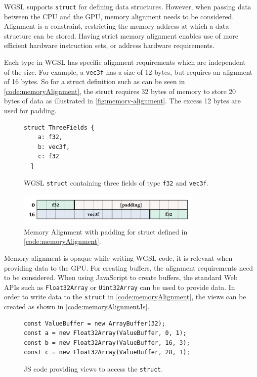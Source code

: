 \gls{WGSL} supports \verb|struct| for defining data structures. However, when passing data between the CPU and the GPU, memory alignment needs to be considered. Alignment is a constraint, restricting the memory address at which a data structure can be stored. Having strict memory alignment enables use of more efficient hardware instruction sets, or address hardware requirements.

Each type in \gls{WGSL} has specific alignment requirements which are independent of the size. For example, a \verb|vec3f| has a size of 12 bytes, but requires an alignment of 16 bytes. So for a struct definition such as can be seen in \autoref{code:memoryAlignment}, the struct requires 32 bytes of memory to store 20 bytes of data as illustrated in \autoref{fig:memory-alignment}. The excess 12 bytes are used for padding.

\begin{figure}[H]
  \begin{lstlisting}[style=wgsl]
  struct ThreeFields {
    a: f32,
    b: vec3f,
    c: f32
  }
  \end{lstlisting}
  \caption{\gls{WGSL} \texttt{struct} containing three fields of type \texttt{f32} and \texttt{vec3f}.}
  \label{code:memoryAlignment}
  \end{figure}

\begin{figure}[H]
  \centering
  \includegraphics[width=0.8\textwidth]{resources/memory-alignment.png}
  \caption{Memory Alignment with padding for struct defined in \autoref{code:memoryAlignment}.}
  \label{fig:memory-alignment}
\end{figure}

Memory alignment is opaque while writing \gls{WGSL} code, it is relevant when providing data to the GPU. For creating buffers, the alignment requirements need to be considered. When using JavaScript to create buffers, the standard Web \glspl{API} such as \texttt{Float32Array} or \texttt{Uint32Array} can be used to provide data. In order to write data to the \texttt{struct} in \autoref{code:memoryAlignment}, the views can be created as shown in \autoref{code:memoryAlignmentJs}.

\begin{figure}[H]
  \begin{lstlisting}[style=JavaScript]
const ValueBuffer = new ArrayBuffer(32);
const a = new Float32Array(ValueBuffer, 0, 1);
const b = new Float32Array(ValueBuffer, 16, 3);
const c = new Float32Array(ValueBuffer, 28, 1);
  \end{lstlisting}
  \caption{JS code providing views to access the \texttt{struct}.}
  \label{code:memoryAlignmentJs}
\end{figure}

